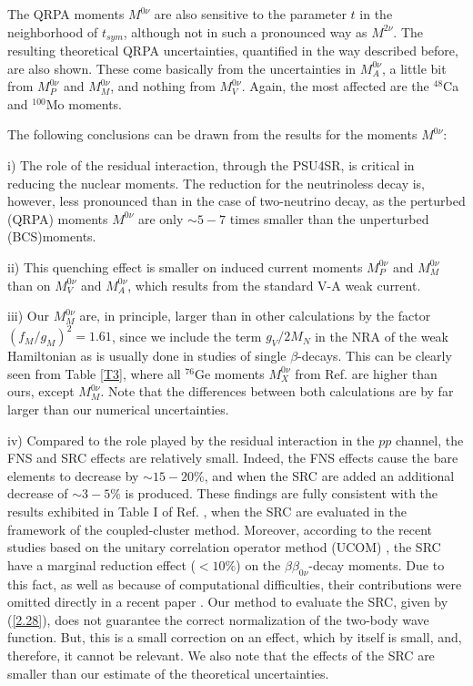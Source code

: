 \documentclass[nofootinbib,twocolumn,eqsecnum,floats,aps]{revtex4}
\def\rf#1{{(\ref{#1})}}
\def\b {{\beta}}
\begin{document}
{The QRPA moments $M^{0\nu}$  are also sensitive to the parameter $t$
in the neighborhood of  $t_{sym}$,
although not in such a pronounced way as $M^{2 \nu}$. The resulting theoretical QRPA
uncertainties, quantified  in the
way described before, are also shown.
These come basically from the uncertainties in $M^{0\nu}_A$, a little bit
from $M^{0\nu}_P$  and $M^{0\nu}_M$, and nothing from $M^{0\nu}_V$.
Again, the most affected are the $^{48}$Ca and $^{100}$Mo moments.

The following conclusions can be drawn
from the results for the moments $M^{0\nu}$:

i) The role of the residual interaction, through the PSU4SR, %
is critical in reducing  the nuclear moments.
The reduction for the neutrinoless decay is, however, less pronounced than
in the case of two-neutrino decay,  as the perturbed (QRPA)
moments $M^{0\nu}$   are only $\sim 5- 7$ times smaller than the unperturbed (BCS)moments.

ii) This quenching effect is smaller on  induced current
moments $M^{0\nu}_P$ and  $M^{0\nu}_{M}$ than  on $M^{0\nu}_V$
and  $M^{0\nu}_A$, which results from the standard  V-A  weak current.

iii) Our $M^{0\nu}_M$ are, in principle, larger than in other
calculations by the factor  $(f_M/g_M)^2=1.61$, since we include
the term $g_V/2M_N$ in the NRA of the weak Hamiltonian as is
usually done in studies of single $\b$-decays.
This can be clearly seen from Table \ref{T3},  where all $^{76}$Ge
moments $M^{0\nu}_{X}$  from Ref. \cite{Hyv15}
are higher than ours, except $M^{0\nu}_{M}$. Note that the differences
between both calculations are by far larger than our numerical uncertainties.

iv) Compared to the role played by the residual interaction in the $pp$ channel,
the FNS and SRC effects are relatively small.
Indeed, the FNS effects cause the bare elements to decrease by $\sim 15-20 \%$,
and when  the SRC  are added an additional decrease of $\sim 3-5\%$
is produced. These findings are fully consistent with the results exhibited
in Table I of Ref. \cite{Sim09}, when the SRC are evaluated in the framework
of the coupled-cluster method.
Moreover, according to the recent studies based on the unitary
correlation operator method (UCOM) \cite{Men09,Eng09},
the SRC have a marginal reduction effect ($<10\%$) on
the  $\b\b_{0\nu}$-decay moments.
Due to this fact, as well as because of computational difficulties,
their contributions  were omitted directly in a recent paper \cite{Yao15}.
Our method to evaluate the SRC, given by \rf{2.28},
does not guarantee the correct normalization of the two-body
wave function. But, this is a small correction on an effect,
which by itself is small, and, therefore, it cannot be relevant.%
We also note that the effects of the SRC
are smaller than our estimate of the theoretical uncertainties.

}
\end{document}
